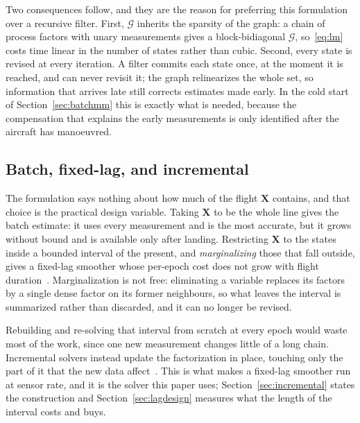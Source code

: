 Two consequences follow, and they are the reason for preferring this formulation
over a recursive filter. First, $\mathcal{G}$ inherits the sparsity of the graph:
a chain of process factors with unary measurements gives a block-bidiagonal
$\mathcal{G}$, so~\eqref{eq:lm} costs time linear in the number of states rather
than cubic. Second, every state is revised at every iteration. A filter commits
each state once, at the moment it is reached, and can never revisit it; the graph
relinearizes the whole set, so information that arrives late still corrects
estimates made early. In the cold start of Section~\ref{sec:batchmm} this is
exactly what is needed, because the compensation that explains the early
measurements is only identified after the aircraft has manoeuvred.

\subsection{Batch, fixed-lag, and incremental}
The formulation says nothing about how much of the flight $\mathbf{X}$ contains,
and that choice is the practical design variable. Taking $\mathbf{X}$ to be the
whole line gives the batch estimate: it uses every measurement and is the most
accurate, but it grows without bound and is available only after landing.
Restricting $\mathbf{X}$ to the states inside a bounded interval of the present,
and \emph{marginalizing} those that fall outside, gives a fixed-lag smoother
whose per-epoch cost does not grow with flight
duration~\cite{indelman2013,kaess2012}. Marginalization is not free: eliminating
a variable replaces its factors by a single dense factor on its former
neighbours, so what leaves the interval is summarized rather than discarded, and
it can no longer be revised.

Rebuilding and re-solving that interval from scratch at every epoch would waste
most of the work, since one new measurement changes little of a long chain.
Incremental solvers instead update the factorization in place, touching only the
part of it that the new data affect~\cite{kaess2012}. This is what makes a
fixed-lag smoother run at sensor rate, and it is the solver this paper uses;
Section~\ref{sec:incremental} states the construction and
Section~\ref{sec:lagdesign} measures what the length of the interval costs and
buys.
